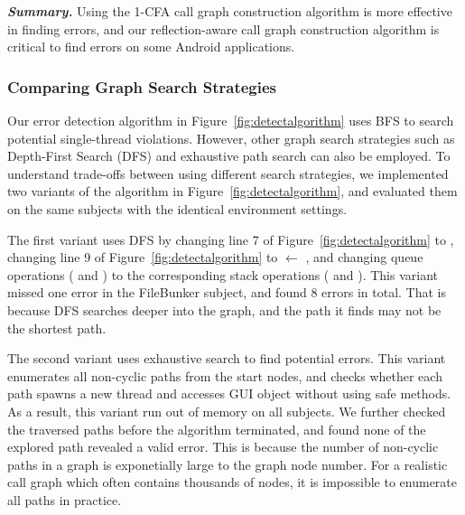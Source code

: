 \noindent \textbf{\textit{Summary.}} Using the 1-CFA call graph construction
algorithm is more effective in finding errors, and our reflection-aware call
graph construction algorithm is critical to find errors on some
Android applications.

\subsubsection{Comparing Graph Search Strategies}
\label{sec:search}

Our error detection algorithm in Figure~\ref{fig:detectalgorithm} uses BFS to search potential
single-thread violations. However, other graph search strategies such as
Depth-First Search (DFS) and exhaustive path search can also be employed. To
understand trade-offs between using different search strategies, we 
implemented two variants of the algorithm in Figure~\ref{fig:detectalgorithm}, and
evaluated them on the same subjects with the identical environment settings.

The first variant uses DFS by changing line 7 of Figure~\ref{fig:detectalgorithm}
to , changing line 9 of Figure~\ref{fig:detectalgorithm}
to  $\leftarrow$ , and changing queue operations
( and ) to the corresponding stack operations ( and ).
This variant missed one error in the FileBunker subject, and found 8 errors
in total.  That is because DFS searches deeper into the graph, and the path it finds
may not be the shortest path.


The second variant uses exhaustive search to find potential errors. This variant
enumerates all non-cyclic paths from the start nodes, and checks whether each
path spawns a new thread and accesses GUI object without using safe methods. As
a result, this variant run out of memory on all subjects. We further checked
the traversed paths before the algorithm terminated, and found none of the explored
path revealed a valid error. This is because the number of
non-cyclic paths in a graph is exponetially large to the graph node number.
For a realistic call graph which often contains thousands of nodes, it is impossible to enumerate all
paths in practice. 


